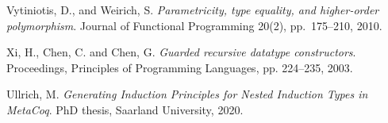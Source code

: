 \documentclass[9pt]{entcs}
\begin{document}
\begin{thebibliography}{10}
 Vytiniotis, D., and Weirich, S.  {\em Parametricity,
  type equality, and higher-order polymorphism}.  Journal of
  Functional Programming 20(2), pp.~175--210, 2010.

 Xi, H., Chen, C. and Chen, G. {\em Guarded recursive
  datatype constructors}. Proceedings, Principles of Programming
  Languages, pp. 224–235, 2003.

 Ullrich, M. {\em Generating Induction Principles for
Nested Induction Types in MetaCoq}. PhD thesis, Saarland University,
  2020.  
  
\end{thebibliography}
\end{document}
